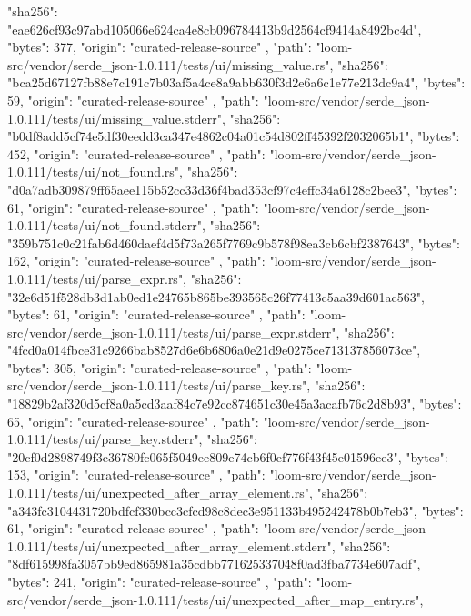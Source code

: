 {{      "sha256": "eae626cf93c97abd105066e624ca4e8cb096784413b9d2564cf9414a8492bc4d",
      "bytes": 377,
      "origin": "curated-release-source"
    },
    {
      "path": "loom-src/vendor/serde_json-1.0.111/tests/ui/missing_value.rs",
      "sha256": "bca25d67127fb88e7c191c7b03af5a4ce8a9abb630f3d2e6a6c1e77e213dc9a4",
      "bytes": 59,
      "origin": "curated-release-source"
    },
    {
      "path": "loom-src/vendor/serde_json-1.0.111/tests/ui/missing_value.stderr",
      "sha256": "b0df8add5cf74e5df30eedd3ca347e4862c04a01c54d802ff45392f2032065b1",
      "bytes": 452,
      "origin": "curated-release-source"
    },
    {
      "path": "loom-src/vendor/serde_json-1.0.111/tests/ui/not_found.rs",
      "sha256": "d0a7adb309879ff65aee115b52cc33d36f4bad353cf97c4effc34a6128c2bee3",
      "bytes": 61,
      "origin": "curated-release-source"
    },
    {
      "path": "loom-src/vendor/serde_json-1.0.111/tests/ui/not_found.stderr",
      "sha256": "359b751c0c21fab6d460daef4d5f73a265f7769c9b578f98ea3cb6cbf2387643",
      "bytes": 162,
      "origin": "curated-release-source"
    },
    {
      "path": "loom-src/vendor/serde_json-1.0.111/tests/ui/parse_expr.rs",
      "sha256": "32e6d51f528db3d1ab0ed1e24765b865be393565c26f77413c5aa39d601ac563",
      "bytes": 61,
      "origin": "curated-release-source"
    },
    {
      "path": "loom-src/vendor/serde_json-1.0.111/tests/ui/parse_expr.stderr",
      "sha256": "4fcd0a014fbce31c9266bab8527d6e6b6806a0e21d9e0275ce713137856073ce",
      "bytes": 305,
      "origin": "curated-release-source"
    },
    {
      "path": "loom-src/vendor/serde_json-1.0.111/tests/ui/parse_key.rs",
      "sha256": "18829b2af320d5cf8a0a5cd3aaf84c7e92cc874651c30e45a3acafb76c2d8b93",
      "bytes": 65,
      "origin": "curated-release-source"
    },
    {
      "path": "loom-src/vendor/serde_json-1.0.111/tests/ui/parse_key.stderr",
      "sha256": "20cf0d2898749f3c36780fc065f5049ee809e74cb6f0ef776f43f45e01596ee3",
      "bytes": 153,
      "origin": "curated-release-source"
    },
    {
      "path": "loom-src/vendor/serde_json-1.0.111/tests/ui/unexpected_after_array_element.rs",
      "sha256": "a343fc3104431720bdfcf330bcc3cfcd98c8dec3e951133b495242478b0b7eb3",
      "bytes": 61,
      "origin": "curated-release-source"
    },
    {
      "path": "loom-src/vendor/serde_json-1.0.111/tests/ui/unexpected_after_array_element.stderr",
      "sha256": "8df615998fa3057bb9ed865981a35cdbb771625337048f0ad3fba7734e607adf",
      "bytes": 241,
      "origin": "curated-release-source"
    },
    {
      "path": "loom-src/vendor/serde_json-1.0.111/tests/ui/unexpected_after_map_entry.rs",
}}
